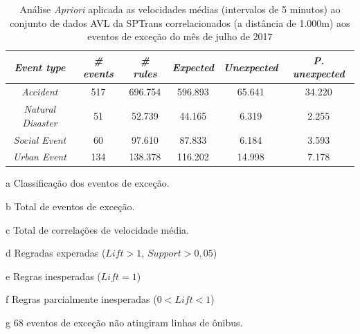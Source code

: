 \documentclass[
	12pt,				%
	oneside,			%
	a4paper,			%
	english,			%
	brazil				%
	]{abntex2ppgsi}
\begin{document}
{{\begin{apendicesenv}
\begin{table}[!htb]
\centering
\begin{threeparttable}
\caption {Análise \textit{Apriori} aplicada as velocidades médias (intervalos de 5 minutos) ao conjunto de dados AVL da SPTrans correlacionados (a distância de 1.000m) aos eventos de exceção do mês de julho de 2017}
\label {tab:aprioriFull}
\begin{tabular}{c|c|c|c|c|c}
\hline
\textbf{\textit{Event type}}\tnote{a} & \textbf{\textit{\# events}}\tnote{b} & \textit{\textbf{\# rules}}\tnote{c} & \textbf{\textit{Expected}}\tnote{d} & \textbf{\textit{Unexpected}}\tnote{e} & \textbf{\textit{P. unexpected}}\tnote{f}   \\
\hline
\textit{Accident} & 517 & 696.754 & 596.893 & 65.641 & 34.220 \\
\textit{Natural Disaster} & 51 & 52.739 & 44.165 & 6.319 & 2.255 \\
\textit{Social Event} & 60 & 97.610 & 87.833 & 6.184 & 3.593 \\
\textit{Urban Event} & 134 & 138.378 & 116.202 & 14.998 & 7.178 \\
\hline
\end{tabular}
\begin{tablenotes}
            \item[a] Classificação dos eventos de exceção.
            \item[b] Total de eventos de exceção.
            \item[c] Total de correlações de velocidade média.
            \item[d] Regradas experadas ($Lift > 1$, $Support > 0,05$)
            \item[e] Regras inesperadas ($Lift = 1$)
            \item[f] Regras parcialmente inesperadas ($0 < Lift < 1$)
            \item[g] 68 eventos de exceção não atingiram linhas de ônibus.
        \end{tablenotes}
\end{threeparttable}
\end{table}



\end{apendicesenv}}}
\end{document}
